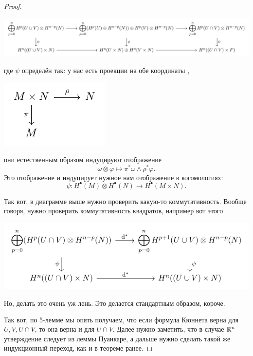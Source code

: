 \begin{proof}
 	 	\begin{center}
 	 		\includegraphics[scale = 0.95]{lectures/7/pictures/cd_24.pdf}
 	 	\end{center}
 	 	где $\psi$ определён так: у нас есть проекции на обе координаты ,
 	 	\begin{center}
 	 		\includegraphics{lectures/7/pictures/cd_25.pdf}
 	 	\end{center}
 	 	они естественным образом индуцируют отображение 
 	 	\[
 	 		\omega \otimes \varphi \mapsto \pi^*\omega \wedge \rho^*\varphi.
 	 	\]
 	 	Это отображение и индуцирует нужное нам отображение в когомологиях: 
 	 	\[
 	 		\psi\colon H^{\bullet}(M) \otimes H^{\bullet}(N) \to H^{\bullet}(M \times N).
 	 	\]

 	 	Так вот, в диаграмме выше нужно проверить какую-то коммутативность. Вообще говоря, нужно проверить коммутативность квадратов, например вот этого 

 	 	\begin{center}
 	 		\includegraphics{lectures/7/pictures/cd_26.pdf}
 	 	\end{center}

 	 	Но, делать это очень уж лень. Это делается стандартным образом, короче. 

 	 	Так вот, по 5-лемме мы опять получаем, что если формула Кюннета верна для $U, V, U \cap V$, то она верна и для $U \cap V$. Далее нужно заметить, что в случае $\mathbb{R}^n$ утверждение следует из леммы Пуанкаре, а дальше нужно сделать такой же индукционный переход, как и в теореме ранее. 

 	 \end{proof}

